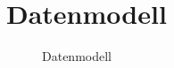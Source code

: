 \section{Datenmodell}
\label{subsec_datenmodell}

\begin{figure}[htp] 
\caption{Datenmodell}
\label{image_konzeption_datenmodell}
\end{figure} 
